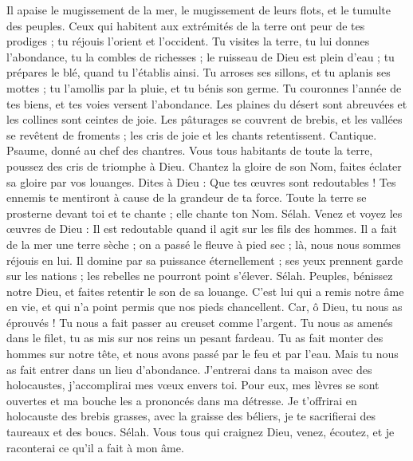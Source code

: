 \begin{multicols}{2}
Il apaise le mugissement de la mer, le mugissement de leurs flots, et le tumulte des peuples.
Ceux qui habitent aux extrémités de la terre ont peur de tes prodiges ; tu réjouis l'orient et l'occident.
Tu visites la terre, tu lui donnes l'abondance, tu la combles de richesses ; le ruisseau de Dieu est plein d'eau ; tu prépares le blé, quand tu l'établis ainsi.
Tu arroses ses sillons, et tu aplanis ses mottes ; tu l'amollis par la pluie, et tu bénis son germe.
Tu couronnes l'année de tes biens, et tes voies versent l'abondance.
Les plaines du désert sont abreuvées et les collines sont ceintes de joie.
Les pâturages se couvrent de brebis, et les vallées se revêtent de froments ; les cris de joie et les chants retentissent.
\VerseOne{}Cantique. Psaume, donné au chef des chantres. Vous tous habitants de toute la terre, poussez des cris de triomphe à Dieu.
Chantez la gloire de son Nom, faites éclater sa gloire par vos louanges.
Dites à Dieu : Que tes œuvres sont redoutables ! Tes ennemis te mentiront à cause de la grandeur de ta force.
Toute la terre se prosterne devant toi et te chante ; elle chante ton Nom. Sélah.
Venez et voyez les œuvres de Dieu : Il est redoutable quand il agit sur les fils des hommes.
Il a fait de la mer une terre sèche ; on a passé le fleuve à pied sec ; là, nous nous sommes réjouis en lui.
Il domine par sa puissance éternellement ; ses yeux prennent garde sur les nations ; les rebelles ne pourront point s'élever. Sélah.
Peuples, bénissez notre Dieu, et faites retentir le son de sa louange.
C'est lui qui a remis notre âme en vie, et qui n'a point permis que nos pieds chancellent.
Car, ô Dieu, tu nous as éprouvés ! Tu nous a fait passer au creuset comme l'argent.
Tu nous as amenés dans le filet, tu as mis sur nos reins un pesant fardeau.
Tu as fait monter des hommes sur notre tête, et nous avons passé par le feu et par l'eau. Mais tu nous as fait entrer dans un lieu d'abondance.
J'entrerai dans ta maison avec des holocaustes, j'accomplirai mes vœux envers toi.
Pour eux, mes lèvres se sont ouvertes et ma bouche les a prononcés dans ma détresse.
Je t'offrirai en holocauste des brebis grasses, avec la graisse des béliers, je te sacrifierai des taureaux et des boucs. Sélah.
Vous tous qui craignez Dieu, venez, écoutez, et je raconterai ce qu'il a fait à mon âme.

\end{multicols}
